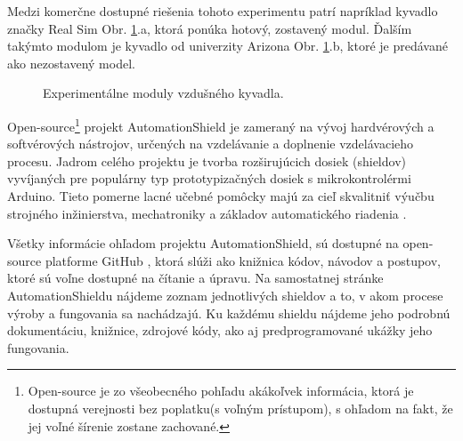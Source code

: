 Medzi komerčne dostupné riešenia tohoto experimentu patrí napríklad kyvadlo značky Real Sim Obr. \ref{OBRAZOK 1.2}.a, ktorá ponúka hotový, zostavený modul. Ďalším takýmto modulom je kyvadlo od univerzity Arizona\cite{enikov_campa_2012} Obr. \ref{OBRAZOK 1.2}.b, ktoré je predávané ako nezostavený model. 

\begin{figure}[!tbh]
	\hfill
	\hfill
	\hfill
	\caption{Experimentálne moduly vzdušného kyvadla.}\label{OBRAZOK 1.2}
\end{figure}

\newpage
Open-source\footnote[1]{Open-source je zo všeobecného pohľadu akákoľvek informácia, ktorá je dostupná verejnosti bez poplatku(s voľným prístupom), s ohľadom na fakt, že jej voľné šírenie zostane zachované.} projekt AutomationShield je zameraný na vývoj hardvérových a softvérových nástrojov, určených na vzdelávanie a doplnenie vzdelávacieho procesu. Jadrom celého projektu je tvorba rozširujúcich dosiek (shieldov) vyvíjaných pre populárny typ prototypizačných dosiek s mikrokontrolérmi Arduino. Tieto pomerne lacné učebné pomôcky majú za cieľ skvalitniť výučbu strojného inžinierstva, mechatroniky a základov automatického riadenia \cite{Auto}.

Všetky informácie ohľadom projektu AutomationShield, sú dostupné na open-source platforme GitHub \cite{Git}, ktorá slúži ako knižnica kódov, návodov a postupov, ktoré sú voľne dostupné na čítanie a úpravu. Na samostatnej stránke AutomationShieldu nájdeme zoznam jednotlivých shieldov a to, v akom procese výroby a fungovania sa nachádzajú. Ku každému shieldu nájdeme jeho podrobnú dokumentáciu, knižnice, zdrojové kódy, ako aj predprogramované ukážky jeho fungovania. 

